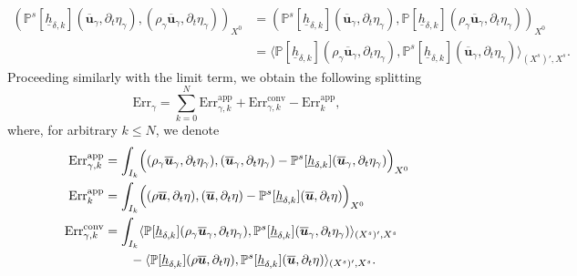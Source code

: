 \documentclass[JEP,XML,SOM,Unicode,NoFloatCountersInSection]{cedram}
\newcommand{\app}{\mathrm{app}}
\newcommand{\conv}{\mathrm{conv}}
\newcommand{\Err}{\mathrm{Err}}
\theoremstyle{remark}
\theoremstyle{definition}
\newcommand{\ug}{\boldsymbol{u}}
\newcommand{\hb}{{\underline{h}}}
\begin{document}
\begin{align*}
( \mathbb{P}^{s}[\hb_{\delta, k}](\overline{\ug}_{\gamma},\partial_{t}\eta_{\gamma}),(\rho_{\gamma} \overline{\ug}_{\gamma},\partial_t \eta_{\gamma}))_{X^0}
& \!=\! ( \mathbb{P}^{s}[\hb_{\delta, k}](\overline{\ug}_{\gamma},\partial_{t}\eta_{\gamma}),\mathbb P[\hb_{\delta,k}](\rho_{\gamma} \overline{\ug}_{\gamma},\partial_t \eta_{\gamma}))_{X^0} \\
& \!=\! \langle \mathbb P[\hb_{\delta,k}](\rho_{\gamma} \overline{\ug}_{\gamma},\partial_t \eta_{\gamma}), \mathbb{P}^{s}[\hb_{\delta, k}](\overline{\ug}_{\gamma},\partial_{t}\eta_{\gamma}) \rangle_{(X^s)',X^s}.
\end{align*}
Proceeding similarly with the limit term, we obtain the following splitting
\[
\Err_{\gamma} = \sum_{k=0}^N \Err^{\app}_{\gamma,k} + \Err^{\conv}_{\gamma,k} - \Err^{\app}_{k},
\]
where, for arbitrary $k \leq N$, we denote
\begin{align*}
\Err^{\app}_{\gamma,k} & = \int_{I_{k}} \Bigl( (\rho_{\gamma} \overline{\ug}_{\gamma},\partial_t \eta_{\gamma}),( \overline{\ug}_{\gamma},\partial_t \eta_{\gamma})- \mathbb{P}^{s}[\hb_{\delta, k}](\overline{\ug}_{\gamma},\partial_{t}\eta_{\gamma})\Bigr)_{X^0} \\
\Err^{\app}_{k} &= \int_{I_{k}} \Bigl( (\rho \overline{\ug},\partial_t \eta),( \overline{\ug},\partial_t \eta)- \mathbb{P}^{s}[\hb_{\delta, k}](\overline{\ug},\partial_{t}\eta)\Bigr)_{X^0}\\
\Err^{\conv}_{\gamma,k} &= \int_{I_k} \langle \mathbb P[\hb_{\delta,k}](\rho_{\gamma} \overline{\ug}_{\gamma},\partial_t \eta_{\gamma}), \mathbb{P}^{s}[\hb_{\delta, k}](\overline{\ug}_{\gamma},\partial_{t}\eta_{\gamma}) \rangle_{(X^s)',X^s} \\
& \qquad
- \langle \mathbb P[\hb_{\delta,k}](\rho \overline{\ug},\partial_t \eta), \mathbb{P}^{s}[\hb_{\delta, k}](\overline{\ug},\partial_{t}\eta) \rangle_{(X^s)',X^s}.
\end{align*}
\end{document}
